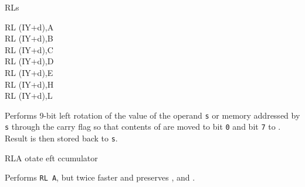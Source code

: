 \begin{basedescript}{
	\desclabelstyle{\multilinelabel}
	\desclabelwidth{3cm}}
\begin{DetailItem}{RL}{s}
\begin{DetailVariants}
			\columnbreak
			RL (IY+d),A\UNDOC\\
			RL (IY+d),B\UNDOC\\
			RL (IY+d),C\UNDOC\\
			RL (IY+d),D\UNDOC\\
			RL (IY+d),E\UNDOC\\
			RL (IY+d),H\UNDOC\\
			RL (IY+d),L\UNDOC
		\end{DetailVariants}

		Performs 9-bit left rotation of the value of the operand {\tt s} or memory addressed by {\tt s} through the carry flag \FlagCF{} so that contents of \FlagCF{} are moved to bit {\tt 0} and bit {\tt 7} to \FlagCF{}. Result is then stored back to {\tt s}.

		\begin{DetailEffects}[p]
			\FlagsRLr
		\end{DetailEffects}

		\begin{DetailEffectsFlags}
			\DetailFlagSF{\DetailFlagResultSign}
			\DetailFlagZF{\DetailFlagResultZero}
			\DetailFlagPV{\DetailFlagResultParity}
		\end{DetailEffectsFlags}

		\begin{DetailTiming}
		\end{DetailTiming}

	\end{DetailItem}


	\begin{DetailItem}{RLA}{}
		{otate eft ccumulator}
		{}

		Performs {\tt RL A}, but twice faster and preserves \FlagSF{}, \FlagZF{} and \FlagPV{}.

		\begin{DetailEffects}
			\FlagsRLA
		\end{DetailEffects}


\end{DetailItem}
\end{basedescript}
